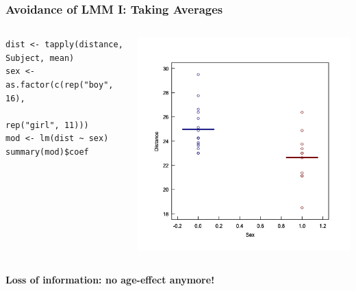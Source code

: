 \documentclass{beamer}
\begin{document}
\begin{frame}[fragile]
    \frametitle{Avoidance of LMM I: Taking Averages}
    \begin{columns}
        \begin{column}{0.6\textwidth}
            \tiny\begin{Verbatim}[frame=single]
dist <- tapply(distance, Subject, mean)
sex <- as.factor(c(rep("boy", 16), 
                   rep("girl", 11)))
mod <- lm(dist ~ sex)
summary(mod)$coef
            \end{Verbatim}
            \tiny\scalebox{1}{
            
            }
        \end{column}
        \begin{column}{0.4\textwidth}
            \includegraphics[width=\textwidth]{lectures/day_6_praxis_and_fitting_of_mems/figures/unnamed-chunk-5-1.png}
        \end{column}
    \end{columns}
    \vspace{0.5cm}
    
    \textbf{Loss of information: no age-effect anymore!}
\end{frame}
\end{document}
